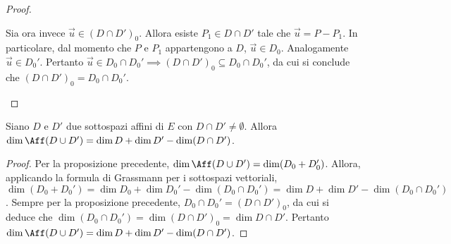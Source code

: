 \documentclass[11pt]{article}
\begin{document}
\begin{proof}
\begin{enumerate}[(i)]
			Sia ora invece $\vec u \in (D \cap D')_0$. Allora esiste $P_1 \in D \cap D'$ tale che
			$\vec u = P - P_1$. In particolare, dal momento che $P$ e $P_1$ appartengono a $D$,
			$\vec u \in D_0$. Analogamente $\vec u \in D_0'$. Pertanto $\vec u \in D_0 \cap D_0' \implies
			(D \cap D')_0 \subseteq D_0 \cap D_0'$, da cui si conclude che $(D \cap D')_0 = D_0 \cap D_0'$. \qedhere
		\end{enumerate}
	\end{proof}
	
	\begin{proposition} 
		Siano $D$ e $D'$ due sottospazi affini di $E$ con $D \cap D' \neq \emptyset$. Allora
		$\dim \Aff(D \cup D') = \dim D + \dim D' - \dim (D \cap D')$.
	\end{proposition}
	
	\begin{proof}
		Per la proposizione precedente, $\dim \Aff(D \cup D') = \dim (D_0 + D_0')$. Allora, applicando
		la formula di Grassmann per i sottospazi vettoriali, $\dim (D_0 + D_0') = \dim D_0 + \dim D_0' - \dim (D_0 \cap D_0') = \dim D + \dim D' - \dim (D_0 \cap D_0')$. Sempre per la proposizione precedente,
		$D_0 \cap D_0' = (D \cap D')_0$, da cui si deduce che $\dim (D_0 \cap D_0') = \dim (D \cap D')_0 = \dim D \cap D'$. Pertanto $\dim \Aff(D \cup D') = \dim D + \dim D' - \dim (D \cap D')$.
	\end{proof}
\end{document}
